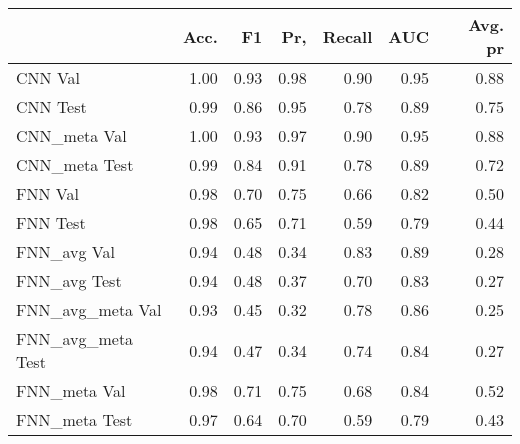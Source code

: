 \begin{tabular}{lrrrrrr}
\toprule
{} &  Acc. &    F1 &   Pr, &  Recall &   AUC &  Avg. pr \\
\midrule
CNN Val           &  1.00 &  0.93 &  0.98 &    0.90 &  0.95 &     0.88 \\
CNN Test          &  0.99 &  0.86 &  0.95 &    0.78 &  0.89 &     0.75 \\
CNN\_meta Val      &  1.00 &  0.93 &  0.97 &    0.90 &  0.95 &     0.88 \\
CNN\_meta Test     &  0.99 &  0.84 &  0.91 &    0.78 &  0.89 &     0.72 \\
FNN Val           &  0.98 &  0.70 &  0.75 &    0.66 &  0.82 &     0.50 \\
FNN Test          &  0.98 &  0.65 &  0.71 &    0.59 &  0.79 &     0.44 \\
FNN\_avg Val       &  0.94 &  0.48 &  0.34 &    0.83 &  0.89 &     0.28 \\
FNN\_avg Test      &  0.94 &  0.48 &  0.37 &    0.70 &  0.83 &     0.27 \\
FNN\_avg\_meta Val  &  0.93 &  0.45 &  0.32 &    0.78 &  0.86 &     0.25 \\
FNN\_avg\_meta Test &  0.94 &  0.47 &  0.34 &    0.74 &  0.84 &     0.27 \\
FNN\_meta Val      &  0.98 &  0.71 &  0.75 &    0.68 &  0.84 &     0.52 \\
FNN\_meta Test     &  0.97 &  0.64 &  0.70 &    0.59 &  0.79 &     0.43 \\
\bottomrule
\end{tabular}
